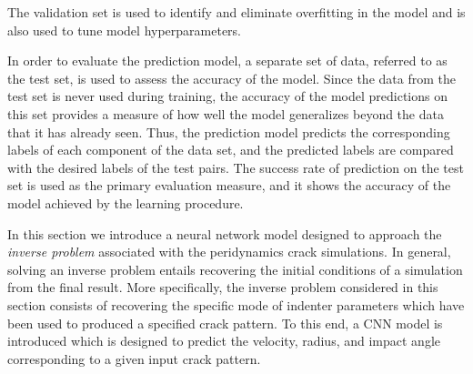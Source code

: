  The validation set is used to identify and eliminate overfitting in the model and is also used to tune model hyperparameters.

 
 In order to evaluate the prediction model, a separate set of data, referred to as the test set, is used to assess the accuracy of the model.
Since the data from the test set is never used during training, the accuracy of the model predictions on this set provides a measure of how well the model generalizes beyond the data that it has already seen.
 Thus, the prediction model predicts the corresponding labels of each component of the data set, and the predicted labels are compared with the desired labels of the test pairs.
 The success rate of prediction on the test set is used as the primary evaluation measure, and it shows the accuracy of the model achieved by the learning procedure. %


In this section we introduce a neural network model designed to approach the {\emph{inverse problem}} associated with the peridynamics crack simulations.
In general, solving an inverse problem entails recovering the initial conditions of a simulation from the final result.
More specifically, the inverse problem considered in this section consists of recovering the specific mode of indenter parameters which have been used to produced a specified crack pattern.
To this end, a CNN model is introduced which is designed to predict the velocity, radius, and impact angle corresponding to a given input crack pattern.

